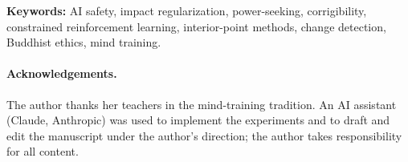 \documentclass[11pt]{article}
\theoremstyle{remark}
\begin{document}
\begin{abstract}
Code reproducing every number and figure, with unit tests that check the propositions numerically, is included, together with a guide to the function-approximation counterpart of each component.
\end{abstract}

\noindent\textbf{Keywords:} AI safety, impact regularization, power-seeking, corrigibility, constrained reinforcement learning, interior-point methods, change detection, Buddhist ethics, mind training.









\paragraph{Acknowledgements.}
The author thanks her teachers in the mind-training tradition. An AI assistant (Claude, Anthropic) was used to implement the experiments and to draft and edit the manuscript under the author's direction; the author takes responsibility for all content.




\appendix



\end{document}
